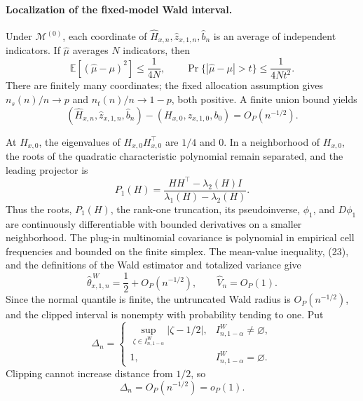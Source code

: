 \paragraph{Localization of the fixed-model Wald interval.}
Under \(\mathcal M^{(0)}\), each coordinate of \(\widehat H_{x,n},\widehat z_{x,1,n},\widehat b_n\) is an average of independent indicators. If \(\widehat\mu\) averages \(N\) indicators, then
\[
\mathbb E[(\widehat\mu-\mu)^2]\le\frac1{4N},
\qquad
\Pr\{|\widehat\mu-\mu|>t\}\le\frac1{4Nt^2}.
\tag{22}
\]
There are finitely many coordinates; the fixed allocation assumption gives \(n_s(n)/n\to p\) and \(n_t(n)/n\to1-p\), both positive. A finite union bound yields
\[
(\widehat H_{x,n},\widehat z_{x,1,n},\widehat b_n)
-(H_{x,0},z_{x,1,0},b_0)=O_P(n^{-1/2}).
\tag{23}
\]

At \(H_{x,0}\), the eigenvalues of \(H_{x,0}H_{x,0}^{\top}\) are \(1/4\) and \(0\). In a neighborhood of \(H_{x,0}\), the roots of the quadratic characteristic polynomial remain separated, and the leading projector is
\[
P_1(H)=\frac{HH^{\top}-\lambda_2(H)I}{\lambda_1(H)-\lambda_2(H)}.
\tag{24}
\]
Thus the roots, \(P_1(H)\), the rank-one truncation, its pseudoinverse, \(\phi_1\), and \(D\phi_1\) are continuously differentiable with bounded derivatives on a smaller neighborhood. The plug-in multinomial covariance is polynomial in empirical cell frequencies and bounded on the finite simplex. The mean-value inequality, (23), and the definitions of the Wald estimator and totalized variance give
\[
\widehat\theta^{\,W}_{x,1,n}=\frac12+O_P(n^{-1/2}),
\qquad
\widehat V_n=O_P(1).
\tag{25}
\]
Since the normal quantile is finite, the untruncated Wald radius is \(O_P(n^{-1/2})\), and the clipped interval is nonempty with probability tending to one. Put
\[
\Delta_n=
\begin{cases}
\sup_{\zeta\in I^W_{n,1-\alpha}}|\zeta-1/2|,
&I^W_{n,1-\alpha}\ne\varnothing,\\
1,&I^W_{n,1-\alpha}=\varnothing.
\end{cases}
\]
Clipping cannot increase distance from \(1/2\), so
\[
\Delta_n=O_P(n^{-1/2})=o_P(1).
\tag{26}
\]


